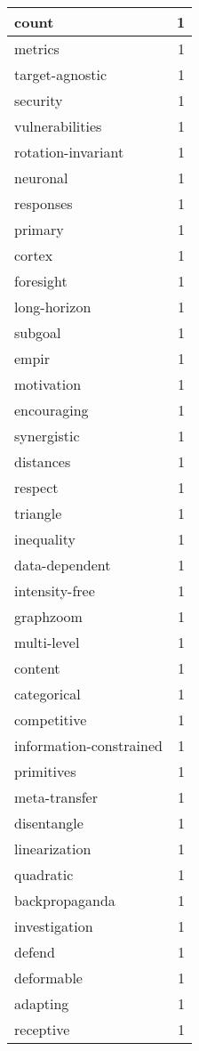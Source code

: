 \begin{table}[h]
\begin{tabular}{|l|r|}
\hline
count & 1 \\
\hline
metrics & 1 \\
\hline
target-agnostic & 1 \\
\hline
security & 1 \\
\hline
vulnerabilities & 1 \\
\hline
rotation-invariant & 1 \\
\hline
neuronal & 1 \\
\hline
responses & 1 \\
\hline
primary & 1 \\
\hline
cortex & 1 \\
\hline
foresight & 1 \\
\hline
long-horizon & 1 \\
\hline
subgoal & 1 \\
\hline
empir & 1 \\
\hline
motivation & 1 \\
\hline
encouraging & 1 \\
\hline
synergistic & 1 \\
\hline
distances & 1 \\
\hline
respect & 1 \\
\hline
triangle & 1 \\
\hline
inequality & 1 \\
\hline
data-dependent & 1 \\
\hline
intensity-free & 1 \\
\hline
graphzoom & 1 \\
\hline
multi-level & 1 \\
\hline
content & 1 \\
\hline
categorical & 1 \\
\hline
competitive & 1 \\
\hline
information-constrained & 1 \\
\hline
primitives & 1 \\
\hline
meta-transfer & 1 \\
\hline
disentangle & 1 \\
\hline
linearization & 1 \\
\hline
quadratic & 1 \\
\hline
backpropaganda & 1 \\
\hline
investigation & 1 \\
\hline
defend & 1 \\
\hline
deformable & 1 \\
\hline
adapting & 1 \\
\hline
receptive & 1 \\

\end{tabular}
\end{table}
